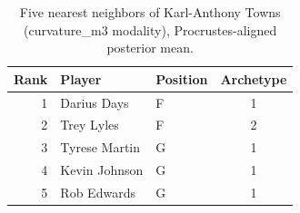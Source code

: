 \begin{table}[htbp]
  \centering\small
  \begin{tabular}{rllc}
    \toprule
    Rank & Player & Position & Archetype \\
    \midrule
    1 & Darius Days & F & 1 \\
    2 & Trey Lyles & F & 2 \\
    3 & Tyrese Martin & G & 1 \\
    4 & Kevin Johnson & G & 1 \\
    5 & Rob Edwards & G & 1 \\
    \bottomrule
  \end{tabular}
  \caption{Five nearest neighbors of Karl-Anthony Towns (curvature_m3 modality), Procrustes-aligned posterior mean.}
  \label{tab:Karl_Anthony_Towns_neighbors_curvature_m3}
\end{table}

